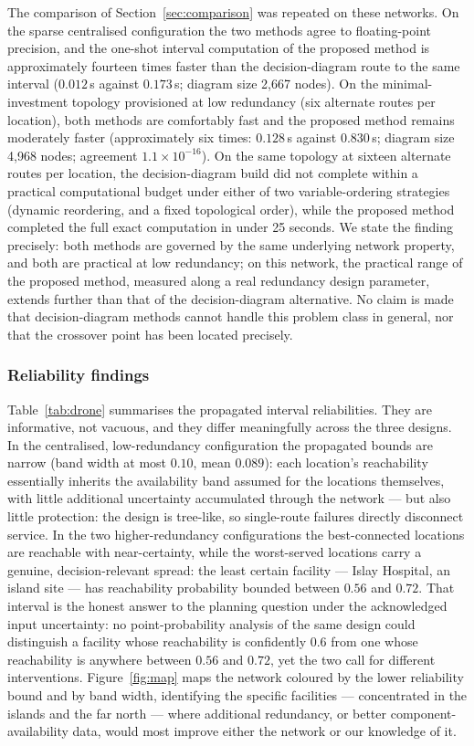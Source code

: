 \documentclass[preprint,12pt]{elsarticle}
\theoremstyle{definition}
\begin{document}
The comparison of Section~\ref{sec:comparison} was repeated on these networks. On the sparse centralised
configuration the two methods agree to floating-point precision, and the one-shot interval computation
of the proposed method is approximately fourteen times faster than the decision-diagram route to the
same interval ($0.012$\,s against $0.173$\,s; diagram size 2{,}667 nodes). On the minimal-investment
topology provisioned at low redundancy (six alternate routes per location), both methods are comfortably
fast and the proposed method remains moderately faster (approximately six times: $0.128$\,s against
$0.830$\,s; diagram size 4{,}968 nodes; agreement $1.1\times10^{-16}$). On the same topology at sixteen
alternate routes per location, the decision-diagram build did not complete within a practical
computational budget under either of two variable-ordering strategies (dynamic reordering, and a fixed
topological order), while the proposed method completed the full exact computation in under 25 seconds.
We state the finding precisely: both methods are governed by the same underlying network property, and
both are practical at low redundancy; on this network, the practical range of the proposed method,
measured along a real redundancy design parameter, extends further than that of the decision-diagram
alternative. No claim is made that decision-diagram methods cannot handle this problem class in general,
nor that the crossover point has been located precisely.

\subsubsection{Reliability findings}\label{sec:findings}

Table~\ref{tab:drone} summarises the propagated interval reliabilities. They are informative, not
vacuous, and they differ meaningfully across the three designs. In the centralised, low-redundancy
configuration the propagated bounds are narrow (band width at most $0.10$, mean $0.089$): each
location's reachability essentially inherits the availability band assumed for the locations themselves,
with little additional uncertainty accumulated through the network --- but also little protection: the
design is tree-like, so single-route failures directly disconnect service. In the two higher-redundancy
configurations the best-connected locations are reachable with near-certainty, while the worst-served
locations carry a genuine, decision-relevant spread: the least certain facility --- Islay Hospital, an
island site --- has reachability probability bounded between $0.56$ and $0.72$. That interval is the
honest answer to the planning question under the acknowledged input uncertainty: no point-probability
analysis of the same design could distinguish a facility whose reachability is confidently $0.6$ from
one whose reachability is anywhere between $0.56$ and $0.72$, yet the two call for different
interventions. Figure~\ref{fig:map} maps the network coloured by the lower reliability bound and by band
width, identifying the specific facilities --- concentrated in the islands and the far north --- where
additional redundancy, or better component-availability data, would most improve either the network or
our knowledge of it.
\end{document}
